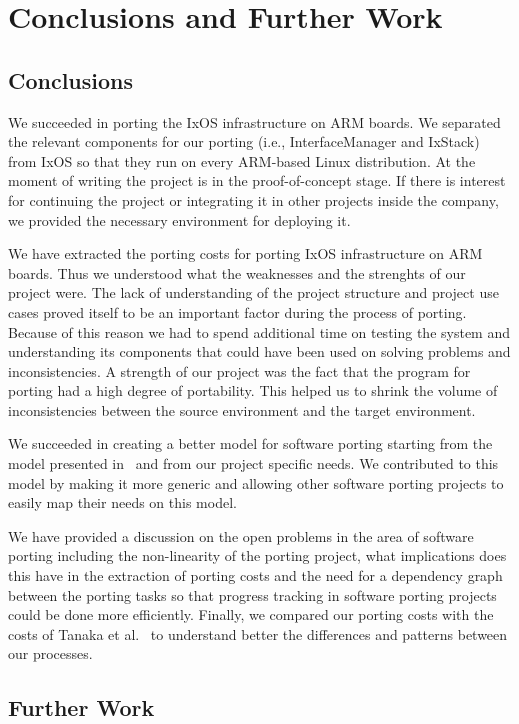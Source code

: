 \section{Conclusions and Further Work}

\subsection{Conclusions}
We succeeded in porting the IxOS infrastructure on ARM boards. We separated the
relevant components for our porting (i.e., InterfaceManager and IxStack) from
IxOS so that they run on every ARM-based Linux distribution.  At the moment of
writing the project is in the proof-of-concept stage. If there is interest for
continuing the project or integrating it in other projects inside the company,
we provided the necessary environment for deploying it.

We have extracted the porting costs for porting IxOS infrastructure on ARM
boards. Thus we understood what the weaknesses and the strenghts of our project
were. The lack of understanding of the project structure and project use cases
proved itself to be an important factor during the process of porting. Because
of this reason we had to spend additional time on testing the system and
understanding its components that could have been used on solving problems and
inconsistencies. A strength of our project was the fact that the program for
porting had a high degree of portability. This helped us to shrink the volume of
inconsistencies between the source environment and the target environment.

We succeeded in creating a better model for software porting starting from the
model presented in~\cite{b1,b2} and from our project specific needs. We
contributed to this model by making it more generic and allowing other software
porting projects to easily map their needs on this model.

We have provided a discussion on the open problems in the area of software
porting including the non-linearity of the porting project, what implications
does this have in the extraction of porting costs and the need for a dependency
graph between the porting tasks so that progress tracking in software porting
projects could be done more efficiently. Finally, we compared our porting costs
with the costs of Tanaka et al.~\cite{b1} to understand better the differences
and patterns between our processes. 

\subsection{Further Work}

